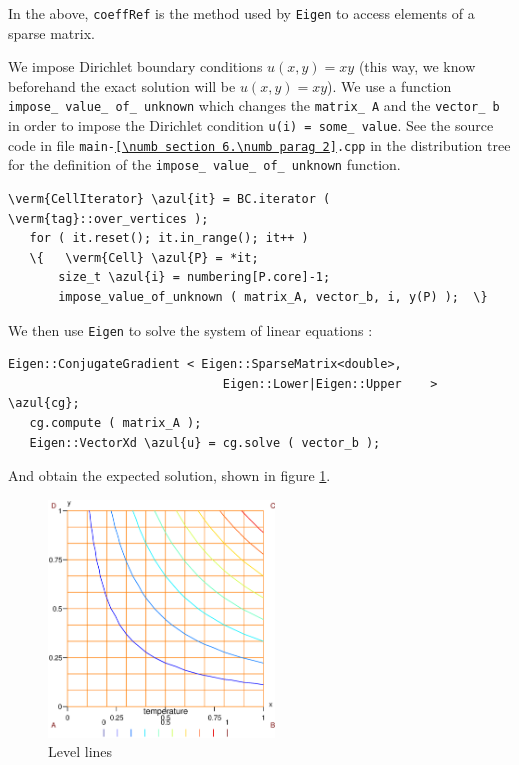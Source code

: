 In the above, {\small\tt coeffRef} is the method used by {\small\tt Eigen} to access elements of
a sparse matrix.

We impose Dirichlet boundary conditions $ u(x,y) = xy $ (this way, we know beforehand
the exact solution will be $ u(x,y) = xy $).
We use a function {\small\tt impose\_\,value\_\,of\_\,unknown} which changes the {\small\tt matrix\_\,A}
and the {\small\tt vector\_\,b} in order to impose the Dirichlet condition {\small\tt u(i) = 
some\_\,value}.
See the source code in file {\small\tt main-\ref{\numb section 6.\numb parag 2}.cpp}
in the distribution tree for the definition of the {\small\tt impose\_\,value\_\,of\_\,unknown}
function.

\begin{Verbatim}[commandchars=\\\{\},formatcom=\small\tt,frame=single,
   label=parag-\ref{\numb section 6.\numb parag 2}.cpp,rulecolor=\color{coment},
   baselinestretch=0.94,framesep=2mm                                            ]
   \verm{CellIterator} \azul{it} = BC.iterator ( \verm{tag}::over_vertices );
   for ( it.reset(); it.in_range(); it++ )
   \{   \verm{Cell} \azul{P} = *it;
       size_t \azul{i} = numbering[P.core]-1;
       impose_value_of_unknown ( matrix_A, vector_b, i, y(P) );  \}
\end{Verbatim}

We then use {\small\tt Eigen} to solve the system of linear equations :

\begin{Verbatim}[commandchars=\\\{\},formatcom=\small\tt,frame=single,
   label=parag-\ref{\numb section 6.\numb parag 2}.cpp,rulecolor=\color{coment},
   baselinestretch=0.94,framesep=2mm                                            ]
   Eigen::ConjugateGradient < Eigen::SparseMatrix<double>,
                              Eigen::Lower|Eigen::Upper    > \azul{cg};
   cg.compute ( matrix_A );
   Eigen::VectorXd \azul{u} = cg.solve ( vector_b );
\end{Verbatim}

And obtain the expected solution, shown in figure \ref{\numb section 6.\numb fig 1}.

\begin{figure} \centering
  \includegraphics[width=60mm]{square-Dirichlet}
  \caption{Level lines}
  \label{\numb section 6.\numb fig 1}
\end{figure}

